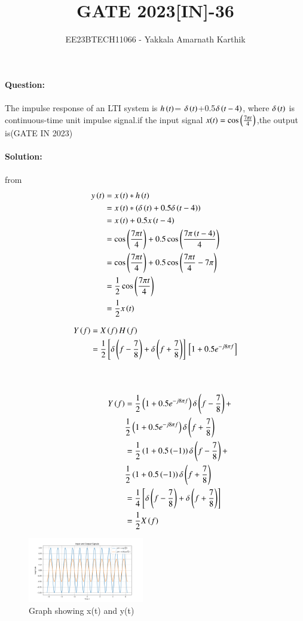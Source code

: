 \documentclass[journal,12pt,twocolumn]{IEEEtran}
\begin{document}


\title{GATE 2023[IN]-36}
\author{EE23BTECH11066 - Yakkala Amarnath Karthik}
\maketitle

\textbf{Question:}\\ \\
The impulse response of an LTI system is $h\left(t\right)$= $\delta\left(t\right)$+0.5$ \delta\left(t-4\right)$, where $\delta\left(t\right)$ is continuous-time unit impulse signal.if the input signal $x(t)=\cos\left(\frac{7\pi t}{4}\right)$,the output is\hfill(GATE IN 2023)\\ \\

\textbf{Solution:}\\
\\
 from 
\begin{align}
    y\left(t\right) &=x\left(t\right) * h\left(t\right)\\
            &=x\left(t\right) * \left(\delta\left(t\right)+0.5 \delta\left(t-4\right)\right)\\
            &=x\left(t\right)+0.5x\left(t-4\right)\\
            &=\cos\left(\frac{7\pi t}{4}\right)+0.5\cos\left(\frac{7\pi \left(t-4\right)}{4}\right)\\
            &=\cos\left(\frac{7\pi t}{4}\right)+0.5\cos\left(\frac{7\pi t}{4}-7\pi\right)\\
            &=\frac{1}{2}\cos\left(\frac{7\pi t}{4}\right)\\
            &=\frac{1}{2}x\left(t\right)
\end{align}

\begin{align}
    Y\left(f\right) &= X\left(f\right)H\left(f\right)\\
   &=\frac{1}{2}{}\left[\delta \left(f-\frac{7}{8}\right)+\delta \left(f+\frac{7}{8}\right)\right]{}\left[1+0.5e^{-j8\pi f}\right]
         \end{align} \\ \\
 \vspace{7.2cm}
\begin{align}
  \hspace{1.2cm}Y\left(f\right) &=\frac{1}{2}\left(1+0.5e^{-j8\pi f}\right)\delta \left(f-\frac{7}{8}\right)+\nonumber\\
   &\frac{1}{2}\left(1+0.5e^{-j8\pi f}\right)\delta \left(f+\frac{7}{8}\right)\\
   &=\frac{1}{2}\left(1+0.5\left(-1\right)\right)\delta \left(f-\frac{7}{8}\right)+\nonumber\\
   &\frac{1}{2}\left(1+0.5\left(-1\right)\right)\delta \left(f+\frac{7}{8}\right)\\
  &=\frac{1}{4}{}\left[\delta \left(f-\frac{7}{8}\right)+\delta \left(f+\frac{7}{8}\right)\right]\\
   &=\frac{1}{2}X\left(f\right)
\end{align}

\begin{figure}[ht]
    \centering
    \includegraphics[width=0.45\textwidth]{figs/pythongate.png}
    \caption{Graph showing x(t) and y(t)}
\end{figure}
\end{document}
